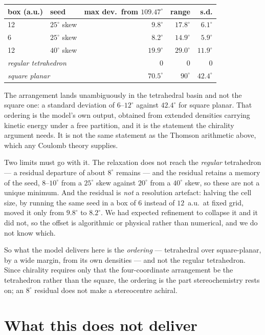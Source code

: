 \documentclass[11pt]{article}
\begin{document}
\begin{center}
\begin{tabular}{llrrr}
\toprule
box (a.u.) & seed & max dev.\ from $109.47^\circ$ & range & s.d. \\
\midrule
12 & $25^\circ$ skew & $9.8^\circ$  & $17.8^\circ$ & $6.1^\circ$ \\
 6 & $25^\circ$ skew & $8.2^\circ$  & $14.9^\circ$ & $5.9^\circ$ \\
12 & $40^\circ$ skew & $19.9^\circ$ & $29.0^\circ$ & $11.9^\circ$ \\
\midrule
\multicolumn{2}{l}{\emph{regular tetrahedron}} & $0$ & $0$ & $0$ \\
\multicolumn{2}{l}{\emph{square planar}} & $70.5^\circ$ & $90^\circ$ & $42.4^\circ$ \\
\bottomrule
\end{tabular}
\end{center}

The arrangement lands unambiguously in the tetrahedral basin and not the square one: a standard
deviation of $6$--$12^\circ$ against $42.4^\circ$ for square planar. That ordering is the model's
own output, obtained from extended densities carrying kinetic energy under a free partition, and it
is the statement the chirality argument needs. It is not the same statement as the Thomson
arithmetic above, which any Coulomb theory supplies.

Two limits must go with it. The relaxation does not reach the \emph{regular} tetrahedron --- a
residual departure of about $8^\circ$ remains --- and the residual retains a memory of the seed,
$8$--$10^\circ$ from a $25^\circ$ skew against $20^\circ$ from a $40^\circ$ skew, so these are not
a unique minimum. And the residual is \emph{not} a resolution artefact: halving the cell size, by
running the same seed in a box of $6$ instead of $12$~a.u.\ at fixed grid, moved it only from
$9.8^\circ$ to $8.2^\circ$. We had expected refinement to collapse it and it did not, so the offset
is algorithmic or physical rather than numerical, and we do not know which.

So what the model delivers here is the \emph{ordering} --- tetrahedral over square-planar, by a
wide margin, from its own densities --- and not the regular tetrahedron. Since chirality requires
only that the four-coordinate arrangement be the tetrahedron rather than the square, the ordering
is the part stereochemistry rests on; an $8^\circ$ residual does not make a stereocentre achiral.

\section{What this does not deliver}\label{sec:limits}
\end{document}
